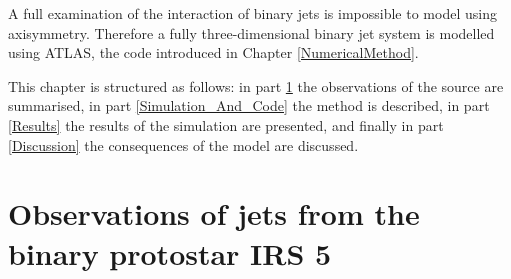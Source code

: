 A full examination of the interaction of binary jets is impossible to model using axisymmetry.
Therefore a fully three-dimensional binary jet system is modelled using ATLAS, the code introduced in Chapter \ref{NumericalMethod}.


This chapter is structured as follows: 
in part \ref{Observation_Section} the observations of the source are summarised, 
in part \ref{Simulation_And_Code} the method is described,
in part \ref{Results} the results of the simulation are presented, 
and finally in part \ref{Discussion} the consequences of the model are discussed.

\section{Observations of jets from the binary protostar IRS 5}
\label{Observation_Section}


